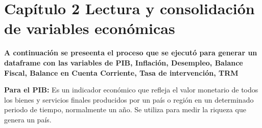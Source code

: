 \documentclass[
  11pt,
]{article}
\newenvironment{Shaded}{\begin{snugshade}}{\end{snugshade}}
\newcommand{\CommentTok}[1]{\textcolor[rgb]{0.56,0.35,0.01}{\textit{#1}}}
\newcommand{\DataTypeTok}[1]{\textcolor[rgb]{0.13,0.29,0.53}{#1}}
\newcommand{\DecValTok}[1]{\textcolor[rgb]{0.00,0.00,0.81}{#1}}
\newcommand{\KeywordTok}[1]{\textcolor[rgb]{0.13,0.29,0.53}{\textbf{#1}}}
\newcommand{\NormalTok}[1]{#1}
\newcommand{\OperatorTok}[1]{\textcolor[rgb]{0.81,0.36,0.00}{\textbf{#1}}}
\newcommand{\StringTok}[1]{\textcolor[rgb]{0.31,0.60,0.02}{#1}}
\begin{document}
\begin{Shaded}
\end{Shaded}

\hypertarget{capuxedtulo-2-lectura-y-consolidaciuxf3n-de-variables-econuxf3micas}{%
\section{Capítulo 2 Lectura y consolidación de variables
económicas}\label{capuxedtulo-2-lectura-y-consolidaciuxf3n-de-variables-econuxf3micas}}

\textbf{A continuación se preseenta el proceso que se ejecutó para generar un dataframe con las variables de PIB, Inflación, Desempleo, Balance Fiscal, Balance en Cuenta Corriente, Tasa de intervención, TRM}

\textbf{Para el PIB:} Es un indicador económico que refleja el valor
monetario de todos los bienes y servicios finales producidos por un país
o región en un determinado periodo de tiempo, normalmente un año. Se
utiliza para medir la riqueza que genera un país.
\end{document}
